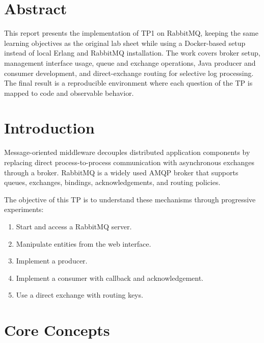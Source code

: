 \documentclass[a4paper,12pt]{article}
\begin{document}
\tableofcontents
\newpage

\section*{Abstract}

This report presents the implementation of TP1 on RabbitMQ, keeping the same learning objectives as the original lab sheet while using a Docker-based setup instead of local Erlang and RabbitMQ installation. The work covers broker setup, management interface usage, queue and exchange operations, Java producer and consumer development, and direct-exchange routing for selective log processing. The final result is a reproducible environment where each question of the TP is mapped to code and observable behavior.

\section{Introduction}

Message-oriented middleware decouples distributed application components by replacing direct process-to-process communication with asynchronous exchanges through a broker. RabbitMQ is a widely used AMQP broker that supports queues, exchanges, bindings, acknowledgements, and routing policies.

The objective of this TP is to understand these mechanisms through progressive experiments:

\begin{enumerate}
    \item Start and access a RabbitMQ server.
    \item Manipulate entities from the web interface.
    \item Implement a producer.
    \item Implement a consumer with callback and acknowledgement.
    \item Use a direct exchange with routing keys.
\end{enumerate}

\section{Core Concepts}
\end{document}
